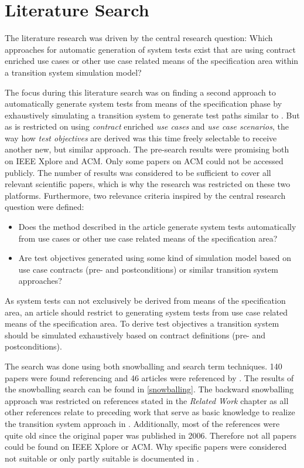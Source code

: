 \section{Literature Search} \label{literaturesearch}

The literature research was driven by the central research question: \glqq Which approaches for automatic generation of system tests exist that are using contract enriched use cases or other use case related means of the specification area within a transition system simulation model?\grqq 

The focus during this literature search was on finding a second approach to automatically generate system tests from means of the specification phase by exhaustively simulating a transition system to generate test paths similar to \cite{ClementineNebut2006}. But as \cite{ClementineNebut2006} is restricted on using \textit{contract} enriched \textit{use cases} and \textit{use case scenarios}, the way how \textit{test objectives} are derived was this time freely selectable to receive another new, but similar approach. The pre-search results were promising both on IEEE Xplore and ACM. Only some papers on ACM could not be accessed publicly. The number of results was considered to be sufficient to cover all relevant scientific papers, which is why the research was restricted on these two platforms. Furthermore, two relevance criteria inspired by the central research question were defined:

\begin{itemize}
	\item Does the method described in the article generate system tests automatically from use cases or other use case related means of the specification area?
	\item Are test objectives generated using some kind of simulation model based on use case contracts (pre- and postconditions) or similar transition system approaches?
\end{itemize} 

As system tests can not exclusively be derived from means of the specification area, an article should restrict to generating system tests from use case related means of the specification area. To derive test objectives a transition system should be simulated exhaustively based on contract definitions (pre- and postconditions). 

The search was done using both snowballing and search term techniques. 140 papers were found referencing \cite{ClementineNebut2006} and 46 articles were referenced by \cite{ClementineNebut2006}. The results of the snowballing search can be found in \autoref{snowballing}. The backward snowballing approach was restricted on references stated in the \textit{Related Work} chapter as all other references relate to preceding work that serve as basic knowledge to realize the transition system approach in \cite{ClementineNebut2006}. Additionally, most of the references were quite old since the original paper was published in 2006. Therefore not all papers could be found on IEEE Xplore or ACM. Why specific papers were considered not suitable or only partly suitable is documented in \cite{FelixHausberger2020}.

